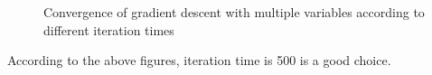 \documentclass{article}
\begin{document}
\begin{itemize}
\begin{figure}[htbp]
    \caption{Convergence of gradient descent with multiple variables according to different iteration times}
\end{figure}

According to the above figures, iteration time is 500 is a good choice.
\end{itemize}
\end{document}
